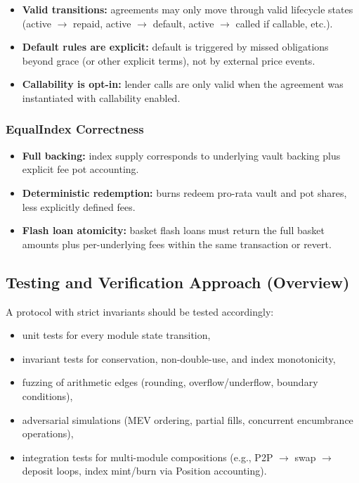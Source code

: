 \documentclass[version=preprint]{iacrcc}
\begin{document}
\begin{itemize}
  \item \textbf{Valid transitions:} agreements may only move through valid lifecycle states (active $\rightarrow$ repaid, active $\rightarrow$ default, active $\rightarrow$ called if callable, etc.).
  \item \textbf{Default rules are explicit:} default is triggered by missed obligations beyond grace (or other explicit terms), not by external price events.
  \item \textbf{Callability is opt-in:} lender calls are only valid when the agreement was instantiated with callability enabled.
\end{itemize}

\subsubsection{EqualIndex Correctness}

\begin{itemize}
  \item \textbf{Full backing:} index supply corresponds to underlying vault backing plus explicit fee pot accounting.
  \item \textbf{Deterministic redemption:} burns redeem pro-rata vault and pot shares, less explicitly defined fees.
  \item \textbf{Flash loan atomicity:} basket flash loans must return the full basket amounts plus per-underlying fees within the same transaction or revert.
\end{itemize}

\subsection{Testing and Verification Approach (Overview)}

A protocol with strict invariants should be tested accordingly:
\begin{itemize}
  \item unit tests for every module state transition,
  \item invariant tests for conservation, non-double-use, and index monotonicity,
  \item fuzzing of arithmetic edges (rounding, overflow/underflow, boundary conditions),
  \item adversarial simulations (MEV ordering, partial fills, concurrent encumbrance operations),
  \item integration tests for multi-module compositions (e.g., P2P $\rightarrow$ swap $\rightarrow$ deposit loops, index mint/burn via Position accounting).
\end{itemize}
\end{document}
